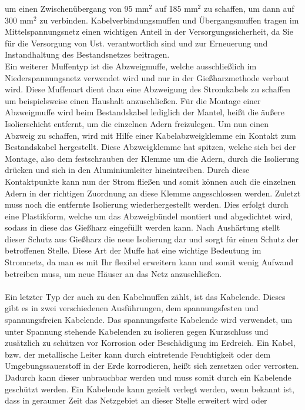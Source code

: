 um einen Zwischenübergang von 95 mm$^2$ auf 185 mm$^2$ zu schaffen, um dann auf 300 mm$^2$ zu verbinden. Kabelverbindungsmuffen und Übergangsmuffen tragen im 
Mittelspannungsnetz einen wichtigen Anteil in der Versorgungssicherheit, da Sie für die Versorgung von Ust. verantwortlich sind und zur Erneuerung und 
Instandhaltung des Bestandsnetzes beitragen.
\\
Ein weiterer Muffentyp ist die Abzweigmuffe, welche ausschließlich im Niederspannungsnetz verwendet wird und nur in der Gießharzmethode verbaut wird. Diese 
Muffenart dient dazu eine Abzweigung des Stromkabels zu schaffen um beispielsweise einen Haushalt anzuschließen. Für die Montage einer Abzweigmuffe wird beim 
Bestandskabel lediglich der Mantel, heißt die äußere Isolierschicht entfernt, um die einzelnen Adern freizulegen. Um nun einen Abzweig zu schaffen, wird mit 
Hilfe einer Kabelabzweigklemme ein Kontakt zum Bestandskabel hergestellt. Diese Abzweigklemme hat spitzen, welche sich bei der Montage, also dem festschrauben 
der Klemme um die Adern, durch die Isolierung drücken und sich in den Aluminiumleiter hineintreiben. Durch diese Kontaktpunkte kann nun der Strom fließen und 
somit können auch die einzelnen Adern in der richtigen Zuordnung an diese Klemme angeschlossen werden. Zuletzt muss noch die entfernte Isolierung 
wiederhergestellt werden. Dies erfolgt durch eine Plastikform, welche um das Abzweigbündel montiert und abgedichtet wird, sodass in diese das Gießharz 
eingefüllt werden kann. Nach Aushärtung stellt dieser Schutz aus Gießharz die neue Isolierung dar und sorgt für einen Schutz der betroffenen Stelle. Diese 
Art der Muffe hat eine wichtige Bedeutung im Stromnetz, da man es mit Ihr flexibel erweitern kann und somit wenig Aufwand betreiben muss, um \zB neue Häuser 
an das Netz anzuschließen.
\\\\
Ein letzter Typ der auch zu den Kabelmuffen zählt, ist das Kabelende. Dieses gibt es in zwei verschiedenen Ausführungen, dem spannungsfesten und 
spannungsfreien Kabelende. Das spannungsfeste Kabelende wird verwendet, um unter Spannung stehende Kabelenden zu isolieren gegen Kurzschluss und zusätzlich 
zu schützen vor Korrosion oder Beschädigung im Erdreich. Ein Kabel, bzw. der metallische Leiter kann durch eintretende Feuchtigkeit oder dem 
Umgebungssauerstoff in der Erde korrodieren, heißt sich zersetzen oder verrosten. Dadurch kann dieser unbrauchbar werden und muss somit durch ein Kabelende 
geschützt werden. Ein Kabelende kann gezielt verlegt werden, wenn \zB bekannt ist, dass in geraumer Zeit das Netzgebiet an dieser Stelle erweitert wird oder 
